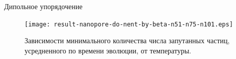 \begin{frame}{Дипольное упорядочение}
    \begin{figure}
    \texttt{[image: result-nanopore-do-nent-by-beta-n51-n75-n101.eps]}
    \caption{
      Зависимости минимального количества числа запутанных частиц,
      усредненного по времени эволюции, от температуры.
     }
    \end{figure}
\end{frame}
